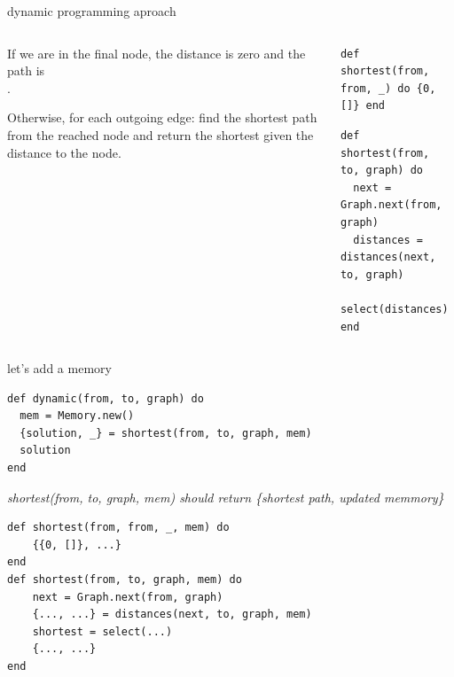 \begin{frame}[fragile]{dynamic programming aproach}

\begin{columns}
 \begin{column}{0.4\linewidth}
  If we are in the final node, the distance is zero and the path is \[\].

  \vspace{10pt}
  Otherwise, for each outgoing edge: find the shortest path from the
  reached node and return the shortest given the distance to the node.

 \end{column}
 \begin{column}{0.6\linewidth}
   \begin{verbatim}
def shortest(from, from, _) do {0, []} end
  \end{verbatim}
  \pause
  \begin{verbatim}
def shortest(from, to, graph) do
  next = Graph.next(from, graph)
  distances = distances(next, to, graph)
  select(distances)
end
  \end{verbatim}
 \end{column}
\end{columns}

\pause\vspace{20pt}{\em What is the complexity?}

\end{frame}

\begin{frame}[fragile]{let's add a memory}

\begin{verbatim}
def dynamic(from, to, graph) do
  mem = Memory.new()
  {solution, _} = shortest(from, to, graph, mem)
  solution
end
\end{verbatim}

\pause\vspace{10pt}

{\em shortest(from, to, graph, mem) should return \{shortest path, updated memmory\}}

\pause\vspace{10pt}
\begin{verbatim}
def shortest(from, from, _, mem) do
    {{0, []}, ...}
end
def shortest(from, to, graph, mem) do
    next = Graph.next(from, graph)
    {..., ...} = distances(next, to, graph, mem)
    shortest = select(...)
    {..., ...}
end
\end{verbatim}

\end{frame}

